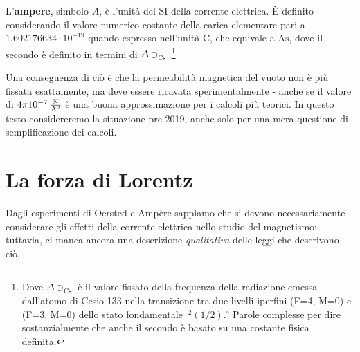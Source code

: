 \begin{define}[Ampere (2019)]
	L'\textbf{ampere}, simbolo $A$, è l'unità del SI della corrente elettrica. È definito considerando il valore numerico costante della carica elementare pari a $1.602176634\cdot10^{-19}$ quando espresso nell'unità $\unit{\coulomb}$, che equivale a $\unit{\ampere\second}$, dove il secondo è definito in termini di $\Delta \ni_{\textrm{Cs}}$.\footnote{Dove $\Delta \ni_{\textrm{Cs}}$ è il valore fissato della frequenza della radiazione emessa dall'atomo di Cesio 133 nella transizione tra due livelli iperfini (F=4, M=0) e (F=3, M=0) dello stato fondamentale $~^2(1/2)$.'' Parole complesse per dire sostanzialmente che anche il secondo è basato su una costante fisica definita.} 
\end{define}
Una conseguenza di ciò è che la permeabilità magnetica del vuoto non è più fissata esattamente, ma deve essere ricavata sperimentalmente - anche se il valore di $4\pi \SI[per-mode = fraction]{d-7}{\newton\per\ampere\squared}$ è una buona approssimazione per i calcoli più teorici. In questo testo considereremo la situazione pre-2019, anche solo per una mera questione di semplificazione dei calcoli.
\section{La forza di Lorentz}
Dagli esperimenti di Oersted e Ampère sappiamo che si devono necessariamente considerare gli effetti della corrente elettrica nello studio del magnetismo; tuttavia, ci manca ancora una descrizione \textit{qualitativa} delle leggi che descrivono ciò.

